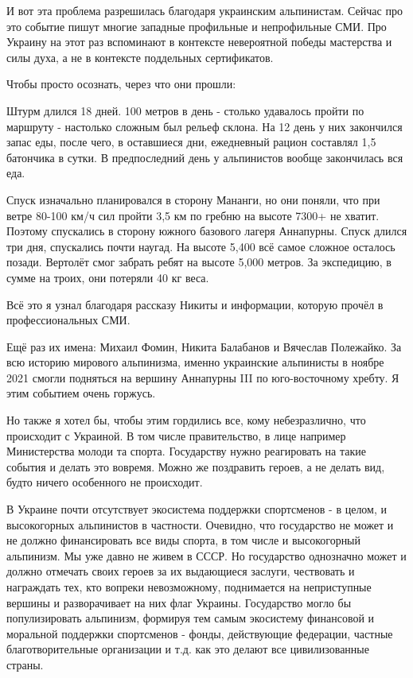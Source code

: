 И вот эта проблема разрешилась благодаря украинским альпинистам. Сейчас про это
событие пишут многие западные профильные и непрофильные СМИ. Про Украину на
этот раз вспоминают в контексте невероятной победы мастерства и силы духа, а не
в контексте поддельных сертификатов.

Чтобы просто осознать, через что они прошли: 

Штурм длился 18 дней. 100 метров в день - столько удавалось пройти по маршруту
- настолько сложным был рельеф склона. На 12 день у них закончился запас еды,
после чего, в оставшиеся дни, ежедневный рацион составлял 1,5 батончика в
сутки. В предпоследний день у альпинистов вообще закончилась вся еда. 

Спуск изначально планировался в сторону Мананги, но они поняли, что при ветре
80-100 км/ч сил пройти 3,5 км по гребню на высоте 7300+ не хватит. Поэтому
спускались в сторону южного базового лагеря Аннапурны. Спуск длился три дня,
спускались почти наугад. На высоте 5,400 всё самое сложное осталось позади.
Вертолёт смог забрать ребят на высоте 5,000 метров. За экспедицию, в сумме на
троих, они потеряли 40 кг веса. 

Всё это я узнал благодаря рассказу Никиты и информации, которую прочёл в
профессиональных СМИ.

Ещё раз их имена: Михаил Фомин, Никита Балабанов и Вячеслав Полежайко. За всю
историю мирового альпинизма, именно украинские альпинисты в ноябре 2021 смогли
подняться на вершину Аннапурны III по юго-восточному хребту. Я этим событием
очень горжусь. 

Но также я хотел бы, чтобы этим гордились все, кому небезразлично, что
происходит с Украиной. В том числе правительство, в лице например Министерства
молоди та спорта. Государству нужно реагировать на такие события и делать это
вовремя. Можно же поздравить героев, а не делать вид, будто ничего особенного
не происходит. 

В Украине почти отсутствует экосистема поддержки спортсменов - в целом, и
высокогорных альпинистов в частности. Очевидно, что государство не может и не
должно финансировать все виды спорта, в том числе и высокогорный альпинизм. Мы
уже давно не живем в СССР. Но государство однозначно может и должно отмечать
своих героев за их выдающиеся заслуги, чествовать и награждать тех, кто вопреки
невозможному, поднимается на неприступные вершины и разворачивает на них флаг
Украины. Государство могло бы популизировать альпинизм, формируя тем самым
экосистему финансовой и моральной поддержки спортсменов - фонды, действующие
федерации, частные благотворительные организации и т.д. как это делают все
цивилизованные страны. 


